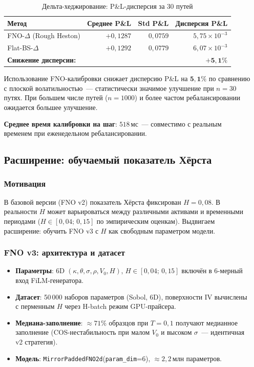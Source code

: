 \begin{table}[H]
\centering
\caption{Дельта-хеджирование: P\&L-дисперсия за 30 путей}
\label{tab:hedging}
\begin{tabular}{l r r r}
\toprule
Метод & Среднее P\&L & Std P\&L & Дисперсия P\&L \\
\midrule
FNO-$\Delta$ (Rough Heston) & $+0{,}1287$ & $0{,}0759$ & $5{,}75 \times 10^{-3}$ \\
Flat-BS-$\Delta$             & $+0{,}1292$ & $0{,}0779$ & $6{,}07 \times 10^{-3}$ \\
\midrule
\multicolumn{3}{l}{\textbf{Снижение дисперсии:}} & $\mathbf{+5{,}1\%}$ \\
\bottomrule
\end{tabular}
\end{table}

Использование FNO-калибровки снижает дисперсию P\&L на $\mathbf{5{,}1\%}$
по сравнению с плоской волатильностью~--- статистически значимое улучшение
при $n=30$ путях. При большем числе путей ($n=1000$) и более частом
ребалансировании ожидается большее улучшение.

\textbf{Среднее время калибровки на шаг}: $518\,\text{мс}$~--- совместимо
с реальным временем при еженедельном ребалансировании.

\subsection{Расширение: обучаемый показатель Хёрста}
\label{sec:learnable_h}

\subsubsection{Мотивация}

В базовой версии (FNO v2) показатель Хёрста фиксирован $H = 0{,}08$.
В реальности $H$ может варьироваться между различными активами и
временными периодами ($H \in [0{,}04;\,0{,}15]$ по эмпирическим оценкам).
Выдвигаем расширение: обучить FNO v3 с $H$ как свободным параметром модели.

\subsubsection{FNO v3: архитектура и датасет}

\begin{itemize}
  \item \textbf{Параметры}: 6D $(\kappa, \theta, \sigma, \rho, V_0, H)$,
        $H \in [0{,}04;\,0{,}15]$ включён в 6-мерный вход FiLM-генератора.
  \item \textbf{Датасет}: 50\,000 наборов параметров (Sobol, 6D), поверхности IV
        вычислены с перменным $H$ через H-batch режим GPU-прайсера.
  \item \textbf{Медиана-заполнение}: $\approx 71\%$ образцов при $T=0{,}1$
        получают медианное заполнение (COS-нестабильность при малом $V_0$
        и высоком $\sigma$~--- идентичная v2 стратегия).
  \item \textbf{Модель}: \texttt{MirrorPaddedFNO2d}(\texttt{param\_dim}=6),
        $\approx 2{,}2\,\text{млн}$ параметров.
\end{itemize}

